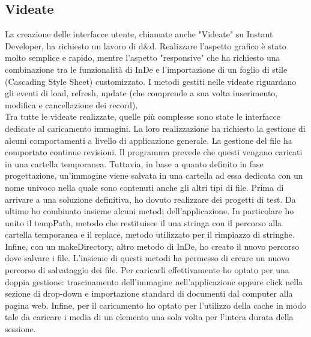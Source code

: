 \subsection{Videate}
La creazione delle interfacce utente, chiamate anche "Videate" su Instant Developer, ha richiesto un lavoro di d\&d. Realizzare l'aspetto grafico è stato molto semplice e rapido, mentre l'aspetto "responsive" che ha richiesto una combinazione tra le funzionalità di InDe e l'importazione di un foglio di stile (Cascading Style Sheet) customizzato.
I metodi gestiti nelle videate riguardano gli eventi di load, refresh, update (che comprende a sua volta inserimento, modifica e cancellazione dei record).\\

Tra tutte le videate realizzate, quelle più complesse sono state le interfacce dedicate al caricamento immagini. La loro realizzazione ha richiesto la gestione di alcuni comportamenti a livello di applicazione generale.
La gestione del file ha comportato continue revisioni. Il programma prevede che questi vengano caricati in una cartella temporanea. Tuttavia, in base a quanto definito in fase progettazione, un'immagine viene salvata in una cartella ad essa dedicata con un nome univoco nella quale sono contenuti anche gli altri tipi di file. 
Prima di arrivare a una soluzione definitiva, ho dovuto realizzare dei progetti di test. Da ultimo ho combinato insieme alcuni metodi dell'applicazione. In particolare ho unito il tempPath, metodo che restituisce il una stringa con il percorso alla cartella temporanea e il replace, metodo utilizzato per il rimpiazzo di stringhe. Infine, con un makeDirectory, altro metodo di InDe, ho creato il nuovo percorso dove salvare i file. 
L'insieme di questi metodi ha permesso di creare un nuovo percorso di salvataggio dei file. Per caricarli effettivamente ho optato per una doppia gestione: trascinamento dell'immagine nell'applicazione oppure click nella sezione di drop-down e importazione standard di documenti dal computer alla pagina web. 
Infine, per il caricamento ho optato per l'utilizzo della cache in modo tale da caricare i media di un elemento una sola volta per l'intera durata della sessione.\\

